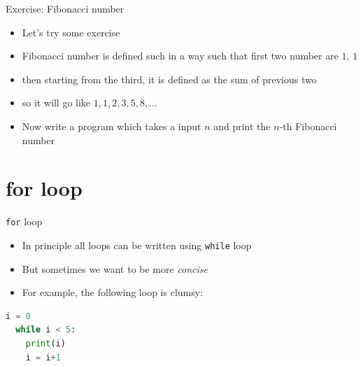 \documentclass[10pt,xcolor={table,dvipsnames},t]{beamer}
\begin{document}
\begin{frame}{Exercise: Fibonacci number}
  \begin{itemize}
    \item Let's try some exercise
    \item Fibonacci number is defined such in a way such that first two number are $1$, $1$
    \item then starting from the third, it is defined as the sum of previous two
    \item so it will go like $1,1,2,3,5,8,...$
    \item Now write a program which takes a input $n$ and print the $n$-th Fibonacci number
  \end{itemize}
\end{frame}



\section{for loop}
\begin{frame}[fragile]{\texttt{for} loop}
  \begin{itemize}
    \item In principle all loops can be written using \texttt{while} loop
    \item But sometimes we want to be more \textit{concise}
    \item For example, the following loop is clumsy:
  \end{itemize}
\begin{lstlisting}[language=python]
  i = 0
  while i < 5:
    print(i)
    i = i+1
\end{lstlisting}
\end{frame}
\end{document}
